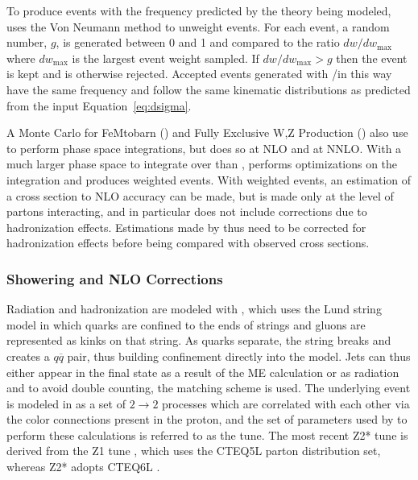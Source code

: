  To produce events with the frequency
  predicted by the theory being modeled,
  \MADEVENT uses the Von Neumann method to unweight events.
 For each event, a random number, $g$, is generated 
  between 0 and 1 and compared to the ratio
  $dw/dw_{\mathrm{max}}$ where $dw_{\mathrm{max}}$
  is the largest event weight sampled.
 If $dw/dw_{\mathrm{max}}>g$ then the event is kept
  and is otherwise rejected.
 Accepted events generated with \MADGRAPH/\MADEVENT in this 
  way have the same frequency and follow the same
  kinematic distributions as predicted
  from the input Equation~\ref{eq:dsigma}.
   
 A Monte Carlo for FeMtobarn (\MCFM)
  and Fully Exclusive W,Z Production (\FEWZ)
  also use \VEGAS to perform phase space
  integrations, but \MCFM does so at NLO 
  and \FEWZ at NNLO.
 With a much larger phase space to 
  integrate over than \MADGRAPH,
  \MCFM performs optimizations
  on the integration and produces weighted events.
 With weighted events, an estimation of
  a cross section to NLO accuracy can be made,
  but is made only at the level of partons interacting,
  and in particular does not include corrections
  due to hadronization effects.
 Estimations made by \MCFM thus need to 
  be corrected for hadronization effects
  before being compared with observed cross sections.


\subsubsection{Showering and NLO Corrections}
 Radiation and hadronization are modeled
  with \PYTHIA, which uses the
  Lund string model in which quarks are
  confined to the ends of strings and
  gluons are represented as kinks on that string.
 As quarks separate, the string breaks and
  creates a $q\overline{q}$ pair, 
  thus building confinement directly into the model.
 Jets can thus either appear in the final state
  as a result of the ME calculation or as
  radiation and to avoid double counting, 
  the \ktmlm matching scheme is used.
 The underlying event is modeled in \PYTHIA
  as a set of $2\rightarrow 2$ processes
  which are correlated with each other via the
  color connections present in the proton,
  and the set of parameters used by \PYTHIA
  to perform these calculations is referred to as 
  the tune.
The most recent \textsc{\PYTHIA} Z2* tune
 is derived from the Z1 tune \cite {Field:2010bc},
 which uses the CTEQ5L parton distribution set,
 whereas Z2* adopts CTEQ6L \cite {ref:CTEQ66}.

